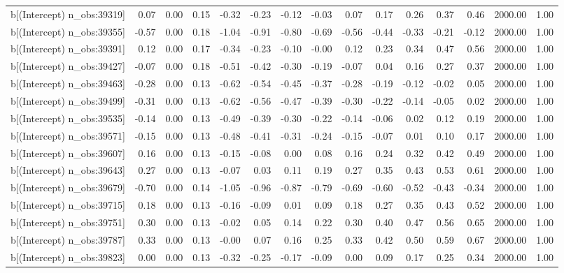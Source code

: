 \begin{table}[ht]
\begin{tabular}{rrrrrrrrrrrrrrr}
  b[(Intercept) n\_obs:39319] & 0.07 & 0.00 & 0.15 & -0.32 & -0.23 & -0.12 & -0.03 & 0.07 & 0.17 & 0.26 & 0.37 & 0.46 & 2000.00 & 1.00 \\ 
  b[(Intercept) n\_obs:39355] & -0.57 & 0.00 & 0.18 & -1.04 & -0.91 & -0.80 & -0.69 & -0.56 & -0.44 & -0.33 & -0.21 & -0.12 & 2000.00 & 1.00 \\ 
  b[(Intercept) n\_obs:39391] & 0.12 & 0.00 & 0.17 & -0.34 & -0.23 & -0.10 & -0.00 & 0.12 & 0.23 & 0.34 & 0.47 & 0.56 & 2000.00 & 1.00 \\ 
  b[(Intercept) n\_obs:39427] & -0.07 & 0.00 & 0.18 & -0.51 & -0.42 & -0.30 & -0.19 & -0.07 & 0.04 & 0.16 & 0.27 & 0.37 & 2000.00 & 1.00 \\ 
  b[(Intercept) n\_obs:39463] & -0.28 & 0.00 & 0.13 & -0.62 & -0.54 & -0.45 & -0.37 & -0.28 & -0.19 & -0.12 & -0.02 & 0.05 & 2000.00 & 1.00 \\ 
  b[(Intercept) n\_obs:39499] & -0.31 & 0.00 & 0.13 & -0.62 & -0.56 & -0.47 & -0.39 & -0.30 & -0.22 & -0.14 & -0.05 & 0.02 & 2000.00 & 1.00 \\ 
  b[(Intercept) n\_obs:39535] & -0.14 & 0.00 & 0.13 & -0.49 & -0.39 & -0.30 & -0.22 & -0.14 & -0.06 & 0.02 & 0.12 & 0.19 & 2000.00 & 1.00 \\ 
  b[(Intercept) n\_obs:39571] & -0.15 & 0.00 & 0.13 & -0.48 & -0.41 & -0.31 & -0.24 & -0.15 & -0.07 & 0.01 & 0.10 & 0.17 & 2000.00 & 1.00 \\ 
  b[(Intercept) n\_obs:39607] & 0.16 & 0.00 & 0.13 & -0.15 & -0.08 & 0.00 & 0.08 & 0.16 & 0.24 & 0.32 & 0.42 & 0.49 & 2000.00 & 1.00 \\ 
  b[(Intercept) n\_obs:39643] & 0.27 & 0.00 & 0.13 & -0.07 & 0.03 & 0.11 & 0.19 & 0.27 & 0.35 & 0.43 & 0.53 & 0.61 & 2000.00 & 1.00 \\ 
  b[(Intercept) n\_obs:39679] & -0.70 & 0.00 & 0.14 & -1.05 & -0.96 & -0.87 & -0.79 & -0.69 & -0.60 & -0.52 & -0.43 & -0.34 & 2000.00 & 1.00 \\ 
  b[(Intercept) n\_obs:39715] & 0.18 & 0.00 & 0.13 & -0.16 & -0.09 & 0.01 & 0.09 & 0.18 & 0.27 & 0.35 & 0.43 & 0.52 & 2000.00 & 1.00 \\ 
  b[(Intercept) n\_obs:39751] & 0.30 & 0.00 & 0.13 & -0.02 & 0.05 & 0.14 & 0.22 & 0.30 & 0.40 & 0.47 & 0.56 & 0.65 & 2000.00 & 1.00 \\ 
  b[(Intercept) n\_obs:39787] & 0.33 & 0.00 & 0.13 & -0.00 & 0.07 & 0.16 & 0.25 & 0.33 & 0.42 & 0.50 & 0.59 & 0.67 & 2000.00 & 1.00 \\ 
  b[(Intercept) n\_obs:39823] & 0.00 & 0.00 & 0.13 & -0.32 & -0.25 & -0.17 & -0.09 & 0.00 & 0.09 & 0.17 & 0.25 & 0.34 & 2000.00 & 1.00 \\ 

\end{tabular}
\end{table}
